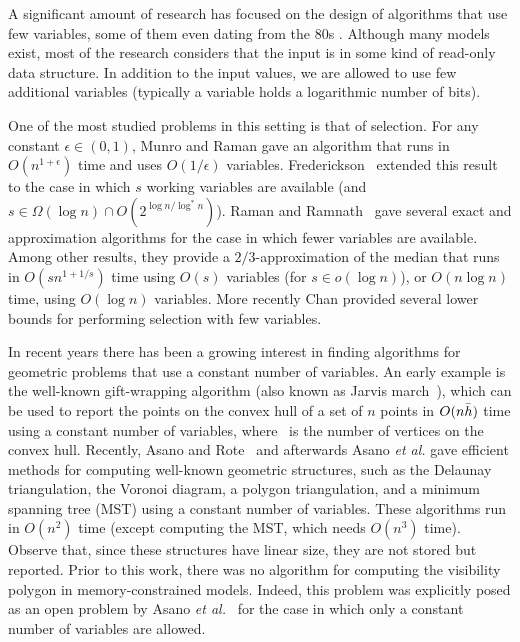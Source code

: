 \documentclass[a4paper]{article}
\begin{document}
A significant amount of research has focused on the design of algorithms that use few variables, some of them even dating from the 80s \cite{mp-ssls-80}. Although many models exist, most of the research considers that the input is in some kind of read-only data structure. In addition to the input values, we are allowed to use few additional variables (typically a variable holds a logarithmic number of bits). 

One of the most studied problems in this setting is that of selection. For any constant $\epsilon \in (0,1)$, Munro and Raman \cite{mr-sromswmdm-96} gave an algorithm that runs in $O(n^{1+\epsilon})$ time and uses $O(1/\epsilon)$ variables. Frederickson~\cite{Frederickson87} extended this result to the case in which $s$ working variables are available (and $s\in \Omega (\log n)\cap O(2^{\log n/\log^* n})$). Raman and Ramnath~\cite{rr-iubtstsls-98} gave several exact and approximation algorithms for the case in which fewer variables are available. Among other results, they provide a $2/3$-approximation of the median that runs in $O(sn^{1+1/s})$ time using $O(s)$ variables (for $s\in o(\log n)$), or $O(n\log n)$ time, using $O(\log n)$ variables. More recently Chan \cite{Chan} provided several lower bounds for performing selection with few variables. 

In recent years there has been a growing interest in finding algorithms for geometric problems that use a constant number of variables.
An early example is the well-known gift-wrapping algorithm (also known as Jarvis march~\cite{j-ich-73}), which can be used to  report the points on the convex hull of a set of $n$ points in $O(n\bar{h})$ time using a constant number of variables, where \Hout\ is the number of vertices on the convex hull. 
Recently, Asano and Rote~\cite{ar-cwagp-09} and afterwards Asano {\em et al.} \cite{amw-cwaspsp-10,abbkmrs-mcasp-11} gave efficient methods for computing well-known geometric structures, such as the Delaunay triangulation, the Voronoi diagram, a polygon triangulation, and a minimum spanning tree (MST) using a constant number of variables. These algorithms run in $O(n^2)$ time (except computing the MST, which needs $O(n^3)$ time). Observe that, since these structures have linear size, they are not stored but reported. Prior to this work, there was no algorithm for computing the visibility polygon in memory-constrained models. Indeed, this problem was explicitly posed as an open problem by Asano {\em et al.}~\cite{amrw-cwagp-10} for the case in which only a constant number of variables are allowed. 
\end{document}
